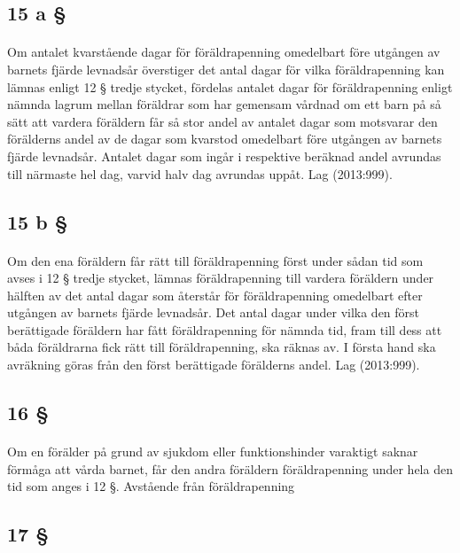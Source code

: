 \documentclass[a4paper,notitlepage,openany,10pt]{book}
\begin{document}
\subsection*{15 a §}
\paragraph*{}
Om antalet kvarstående dagar för föräldrapenning omedelbart före utgången av barnets fjärde levnadsår överstiger det antal dagar för vilka föräldrapenning kan lämnas enligt 12 § tredje stycket, fördelas antalet dagar för föräldrapenning enligt nämnda lagrum mellan föräldrar som har gemensam vårdnad om ett barn på så sätt att vardera föräldern får så stor andel av antalet dagar som motsvarar den förälderns andel av de dagar som kvarstod omedelbart före utgången av barnets fjärde levnadsår. Antalet dagar som ingår i respektive beräknad andel avrundas till närmaste hel dag, varvid halv dag avrundas uppåt.
Lag (2013:999).
\subsection*{15 b §}
\paragraph*{}
Om den ena föräldern får rätt till föräldrapenning först under sådan tid som avses i 12 § tredje stycket, lämnas föräldrapenning till vardera föräldern under hälften av det antal dagar som återstår för föräldrapenning omedelbart efter utgången av barnets fjärde levnadsår. Det antal dagar under vilka den först berättigade föräldern har fått föräldrapenning för nämnda tid, fram till dess att båda föräldrarna fick rätt till föräldrapenning, ska räknas av. I första hand ska avräkning göras från den först berättigade förälderns andel.
Lag (2013:999).
\subsection*{16 §}
\paragraph*{}
Om en förälder på grund av sjukdom eller funktionshinder varaktigt saknar förmåga att vårda barnet, får den andra föräldern föräldrapenning under hela den tid som anges i 12 §.
Avstående från föräldrapenning
\subsection*{17 §}
\end{document}
